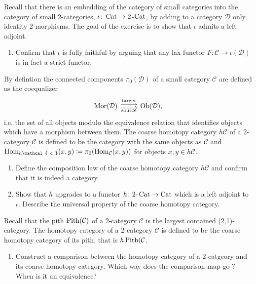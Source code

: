 \begin{Exercise}
	Recall that there is an embedding of the category of small categories into the category of small 2-categories, $ \iota \colon \operatorname{Cat} \to 2$-$ \operatorname{Cat} $, by adding to a category $ \mathcal{ D } $ only identity 2-morphisms.
	The goal of the exercise is to show that $ \iota $ admits a left adjoint.
	\begin{enumerate}[label=(\alph*)]
		\item 
		Confirm that $ \iota $ is fully faithful by arguing that any lax functor $ F \colon \mathcal{ C } \to \iota ( \mathcal{ D } ) $ is in fact a strict functor.
	\end{enumerate}
	
	By defintion the connected components $ \pi_0 ( \mathcal{ D } ) $ of a small category $ \mathcal{ C } $ are defined as the coequalizer
	\[
	\begin{tikzcd}
		\Mor ( \mathcal{ D } ) 
		\ar[r, shift left, "\text{target}"]
		\ar[r, shift right, "\text{source}"']
		&
		\Ob ( \mathcal{ D } ),
	\end{tikzcd}
	\]
	i.e. the set of all objects modulo the equivalence relation that identifies objects which have a morphism between them.
	The coarse homotopy category $ h \mathcal{ C } $ of a 2-category $ \mathcal{C} $ is defined to be the category with the same objects as $ \mathcal{ C } $ and $ \Hom_{ h \mathcal{ c } } ( x , y ) \coloneqq \pi_0 ( \Hom_{ \mathcal{ C } } ( x , y ) ) $ for objects $ x , y \in h \mathcal{ C } $.  
	\begin{enumerate}[resume, label = (\alph*)]
		\item 
		Define the composition law of the coarse homotopy category $ h \mathcal{ C } $ and confirm that it is indeed a category.
		
		\item 
		Show that $ h $ upgrades to a functor $ h \colon 2 \text{-}\operatorname{Cat} \to \operatorname{Cat} $ which is a left adjoint to $ \iota $. Describe the universal property of the coarse homotopy category.
		
	\end{enumerate}
	
	Recall that the pith $ \operatorname{Pith} ( \mathcal{ C } ) $ of a 2-category $ \mathcal{ C } $ is the largest contained (2,1)-category.
	The homotopy category of a 2-category $ \mathcal{ C } $ is defined to be the coarse homotopy category of its pith, that is $ h \operatorname{Pith} ( \mathcal{ C } $.
	
	\begin{enumerate}[resume, label=(\alph*)]
		\item 
		Construct a comparison between the homotopy category of a 2-catgeory and its coarse homotopy category. Which way does the comparison map go ? When is it an equivalence?
	\end{enumerate}
\end{Exercise}

